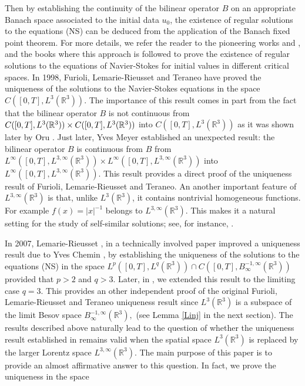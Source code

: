 \documentclass[11pt]{amsart}%
\theoremstyle{plain}
\numberwithin{equation}{section}
\begin{document}
Then by establishing  the continuity of the bilinear operator $B $ on an appropriate Banach space associated to the initial data $u_0$, the existence of regular solutions to the equations (NS) can be deduced from the application of the Banach fixed point theorem. For more details, we refer the reader to the pioneering
works \cite{FK} and \cite{Kato}, and the books \cite{BCD, Can, Lem2} where this approach is followed to prove the existence of regular solutions to the equations of Navier-Stokes for initial values in different critical spaces.
In 1998, Furioli, Lemarie-Rieusset and Teraneo \cite{FLT1} have proved the uniqueness of
the solutions to the Navier-Stokes equations in the space $C([0,T],L^{3}(%
\mathbb{R}^{3})).$ The importance of this result comes in part from the fact
that the bilinear operator $B$ is not continuous from $C([0,T],L^{3}(\mathbb{%
R}^{3}))\times C([0,T],L^{3}(\mathbb{R}^{3}))$ into $C([0,T],L^{3}(\mathbb{R}%
^{3}))$ as it was shown later by Oru \cite{Oru}. Just later, Yves Meyer
\cite {Mey} established an unexpected result: the bilinear operator $B$ is continuous from  $B$ from $L^\infty([0,T],L^{3,\infty }(\mathbb{R}^{3}))\times L^\infty([0,T],L^{3,\infty }(%
\mathbb{R}^{3}))$ into $L^\infty([0,T],L^{3,\infty }(\mathbb{R}^{3}))$. This result provides  a direct proof of the uniqueness result of Furioli, Lemarie-Rieusset and Teraneo. An another important feature of  $L^{3,\infty }(\mathbb{R}^{3})$ is that, unlike $L^{3}(%
\mathbb{R}^{3})$, it contains nontrivial homogeneous functions. For example $f(x)=\left\vert x\right\vert^{-1}$ belongs to $L^{3,\infty }(\mathbb{R}^{3})$. This makes it a natural setting for the study of self-similar solutions; see, for instance, \cite{Lem2, Ler,Pla}.
\par\noindent In 2007, Lemarie-Rieusset \cite{Lem}, in a technically involved paper improved a uniqueness result due to  Yves Chemin \cite{Che}, by establishing the uniqueness of the solutions to the equations (NS) in the space $%
L^{p}([0,T],L^{q}(\mathbb{R}^{3}))\cap C([0,T],B_{\infty }^{-1,\infty }(%
\mathbb{R}^{3}))$ provided that $p>2$ and $q>3.$ Later, in \cite{May2}, we extended this result to the limiting case $q=3$. This provides an other
independent proof of the original Furioli, Lemarie-Rieusset and Teraneo
uniqueness result since $L^{3}(\mathbb{R}^{3})$ is a subspace of the limit Besov
space $B_{\infty }^{-1,\infty }(\mathbb{R}^{3}),$ (see Lemma \ref{Linj} in the next section). The results described above naturally lead to the question of whether the uniqueness result established in \cite{May2} remains valid when the spatial space $L^3(\mathbb{R}^3)$ is replaced by the larger Lorentz space $L^{3,\infty}(\mathbb{R}^3)$. The main purpose of this paper is to provide an almost affirmative answer to this question. In fact,  we prove the uniqueness in the space
\end{document}
